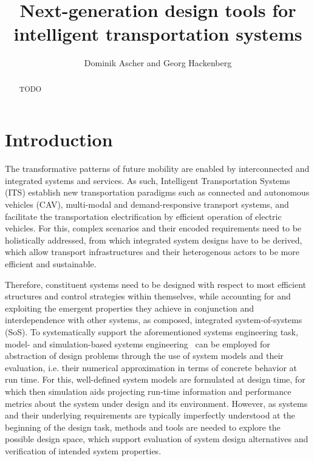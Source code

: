 \documentclass[10pt,twocolumn]{article}
\begin{document}
\title{Next-generation design tools for intelligent transportation systems}
\author{Dominik Ascher and Georg Hackenberg}
\maketitle

\begin{abstract}
    TODO
\end{abstract}

\section{Introduction}
\label{sec:introduction}

The transformative patterns of future mobility are enabled by interconnected and integrated systems and services.
As such, Intelligent Transportation Systems (ITS) establish new transportation paradigms such as connected and autonomous vehicles (CAV), multi-modal and demand-responsive transport systems, and facilitate the transportation electrification by efficient operation of electric vehicles. For this, complex scenarios and their encoded requirements need to be holistically addressed, from which integrated system designs have to be derived, which allow transport infrastructures and their heterogenous actors to be more efficient and sustainable.

Therefore, constituent systems need to be designed with respect to most efficient structures and control strategies within themselves, while accounting for and exploiting the emergent properties they achieve in conjunction and interdependence with other systems, as composed, integrated system-of-systems (SoS). To systematically support the aforementioned systems engineering task, model- and simulation-based systems engineering~\cite{gianni2014modeling} can be employed for abstraction of design problems through the use of system models and their evaluation, i.e. their numerical approximation in terms of concrete behavior at run time. For this, well-defined system models are formulated at design time, for which then simulation aids projecting run-time information and performance metrics about the system under design and its environment. 
However, as systems and their underlying requirements are typically imperfectly understood at the beginning of the design task, methods and tools are needed to explore the possible design space, which support evaluation of system design alternatives and verification of intended system properties. 
\end{document}
